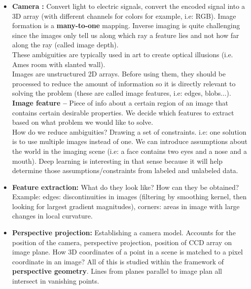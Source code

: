 \documentclass[a4paper,11pt]{article}
\begin{document}
\begin{itemize}
	\item \textbf{Camera :} Convert light to electric signals, convert the encoded signal into a 3D array (with different channels for colors for example, i.e: RGB). Image formation is a \textbf{many-to-one} mapping. Inverse imaging is quite challenging since the images only tell us along which ray a feature lies and not how far along the ray (called image depth).\\
	These ambiguities are typically used in art to create optical illusions (i.e. Ames room with slanted wall).\\
	Images are unstructured 2D arrays. Before using them, they should be processed to reduce the amount of information so it is directly relevant to solving the problem (these are called image features, i.e: edges, blobs...).\\
	\textbf{Image feature --} Piece of info about a certain region of an image that contains certain desirable properties. We decide which features to extract based on what problem we would like to solve.\\
	How do we reduce ambiguities? Drawing a set of constraints. i.e: one solution is to use multiple images instead of one. We can introduce assumptions about the world in the imaging scene (i.e: a face contains two eyes and a nose and a mouth). Deep learning is interesting in that sense because it will help determine those assumptions/constraints from labeled and unlabeled data.
	\item \textbf{Feature extraction:} What do they look like? How can they be obtained? Example: edges: discontinuities in images (filtering by smoothing kernel, then looking for largest gradient magnitudes), corners: areas in image with large changes in local curvature.
	\item \textbf{Perspective projection:} Establishing a camera model. Accounts for the position of the camera, perspective projection, position of CCD array on image plane. How 3D coordinates of a point in a scene is matched to a pixel coordinate in an image? All of this is studied within the framework of \textbf{perspective geometry}. Lines from planes parallel to image plan all intersect in vanishing points.
\end{itemize}
\end{document}
